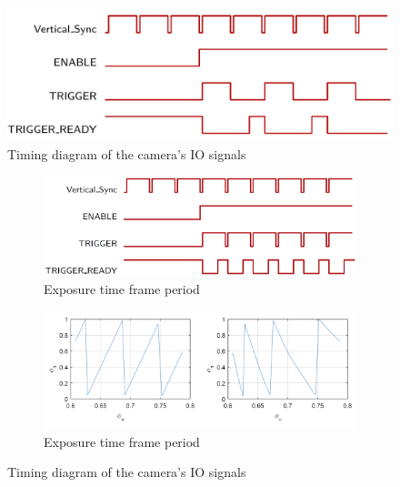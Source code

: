 \documentclass[]{spie}  %
\begin{document}
\begin{figure}[!t]
  \includegraphics[width=\linewidth]{gpio.png}
  \caption{Timing diagram of the camera's IO signals}
  \label{Fig:5}
\end{figure}

\begin{figure}
\centering
\begin{subfigure}{.5\textwidth}
  \centering
  \includegraphics[width=.5\linewidth]{phase2.png}
  \caption{Exposure time \< frame period}
  \label{fig:sub3}
\end{subfigure}%
\begin{subfigure}{.5\textwidth}
  \centering
   \includegraphics[width=.5\linewidth]{phase.png}
  \caption{Exposure time \> frame period}
  \label{fig:sub4}
\end{subfigure}
\caption{Timing diagram of the camera's IO signals}
\label{Fig:7}
\end{figure}
\end{document}
